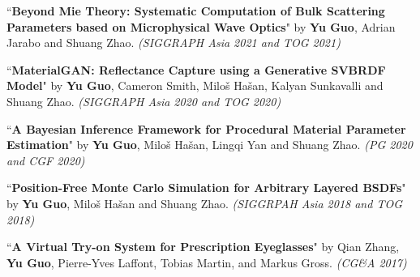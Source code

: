 \documentclass[margin,line]{resume}
\begin{document}
\begin{resume}
%	
	
	``\textbf{Beyond Mie Theory: Systematic Computation of Bulk Scattering Parameters based on Microphysical Wave Optics}" 
	by \textbf{Yu Guo}, Adrian Jarabo and Shuang Zhao. 
	\textsl{(SIGGRAPH Asia 2021 and TOG 2021)}\\
	
	\vspace{-5mm}
	
	``\textbf{MaterialGAN: Reflectance Capture using a Generative SVBRDF Model}" 
	by \textbf{Yu Guo}, Cameron Smith, Milo\v{s} Ha\v{s}an, Kalyan Sunkavalli and Shuang Zhao. 
	\textsl{(SIGGRAPH Asia 2020 and TOG 2020)}\\
	
	\vspace{-5mm}
	
	``\textbf{A Bayesian Inference Framework for Procedural Material Parameter Estimation}" 
	by \textbf{Yu Guo}, Milo\v{s} Ha\v{s}an, Lingqi Yan and Shuang Zhao. 
	\textsl{(PG 2020 and CGF 2020)}\\
	
	\vspace{-5mm}
	
	``\textbf{Position-Free Monte Carlo Simulation for Arbitrary Layered BSDFs}" 
	by \textbf{Yu Guo}, Milo\v{s} Ha\v{s}an and Shuang Zhao. 
	\textsl{(SIGGRPAH Asia 2018 and TOG 2018)}\\
	
	\vspace{-5mm}
	
	``\textbf{A Virtual Try-on System for Prescription Eyeglasses}" 
	by Qian Zhang, \textbf{Yu Guo}, Pierre-Yves Laffont, Tobias Martin, and Markus Gross. 
	\textsl{(CG\&A 2017)}\\
	
	\vspace{-5mm}
	
%	
	

\end{resume}
\end{document}
